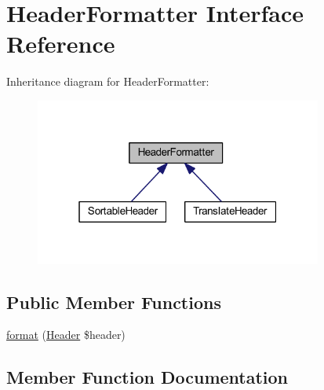 \hypertarget{interfacehamburgscleanest_1_1_data_tables_1_1_interfaces_1_1_header_formatter}{}\section{Header\+Formatter Interface Reference}
\label{interfacehamburgscleanest_1_1_data_tables_1_1_interfaces_1_1_header_formatter}


Inheritance diagram for Header\+Formatter\+:
\nopagebreak
\begin{figure}[H]
\begin{center}
\leavevmode
\includegraphics[width=268pt]{interfacehamburgscleanest_1_1_data_tables_1_1_interfaces_1_1_header_formatter__inherit__graph}
\end{center}
\end{figure}
\subsection*{Public Member Functions}
\begin{DoxyCompactItemize}
\item 
\hyperlink{interfacehamburgscleanest_1_1_data_tables_1_1_interfaces_1_1_header_formatter_aa5aeddf9c056d9583b29322f75f70f82}{format} (\hyperlink{classhamburgscleanest_1_1_data_tables_1_1_models_1_1_header}{Header} \$header)
\end{DoxyCompactItemize}


\subsection{Member Function Documentation}
\mbox{\label{interfacehamburgscleanest_1_1_data_tables_1_1_interfaces_1_1_header_formatter_aa5aeddf9c056d9583b29322f75f70f82}} 
